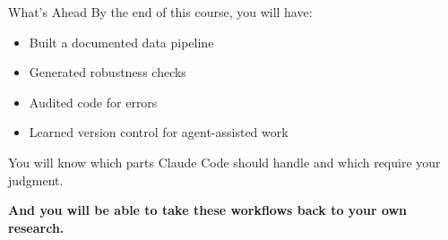 \documentclass[aspectratio=169, 11pt]{beamer}
\begin{document}

\begin{frame}{What's Ahead}
  By the end of this course, you will have:
  \begin{itemize}
    \item Built a documented data pipeline
    \item Generated robustness checks
    \item Audited code for errors
    \item Learned version control for agent-assisted work
  \end{itemize}

  \vspace{0.5em}
  You will know which parts Claude Code should handle and which require your judgment.

  \vspace{0.5em}
  \textbf{And you will be able to take these workflows back to your own research.}
\end{frame}
\end{document}
